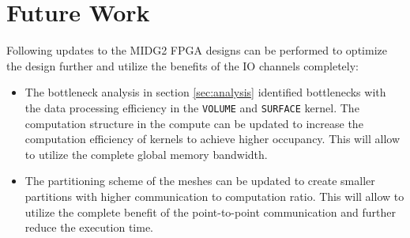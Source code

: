 \section{Future Work}

Following updates to the MIDG2 FPGA designs can be performed to optimize the design
further and utilize the benefits of the IO channels completely:

\begin{itemize}
    \item The bottleneck analysis in section \ref{sec:analysis} identified bottlenecks with the
    data processing efficiency in the \texttt{VOLUME} and \texttt{SURFACE} kernel. The computation structure
    in the compute can be updated to increase the computation efficiency of kernels to achieve
    higher occupancy. This will allow to utilize the complete global memory bandwidth.
    \item The partitioning scheme of the meshes can be updated to create smaller partitions with
    higher communication to computation ratio. This will allow to utilize the complete
    benefit of the point-to-point communication and further reduce the execution time.
\end{itemize}



